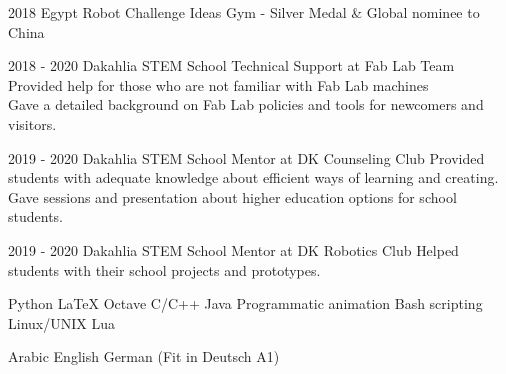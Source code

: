 \documentclass[hidelinks]{report}
\begin{document}
\entry
    {2018}
    {Egypt Robot Challenge} 
    {Ideas Gym}
    {- Silver Medal \& Global nominee to China} 

\vspace{2mm}
    

\entry
    {2018 - 2020}
    {Dakahlia STEM School} 
    {Technical Support at Fab Lab Team} 
    {
     \textbullet Provided help for those who are not familiar with Fab Lab machines\\
     \textbullet Gave a detailed background on Fab Lab policies and tools for newcomers and visitors.
    }
    
\entry
    {2019 - 2020}
    {Dakahlia STEM School}  
    {Mentor at DK Counseling Club} 
    {
     \textbullet Provided students with adequate knowledge about efficient ways of learning and creating.\\
     \textbullet Gave sessions and presentation about higher education options for school students.
    }

\entry
    {2019 - 2020}
    {Dakahlia STEM School}
    {Mentor at DK Robotics Club} 
    {\textbullet Helped students with their school projects and prototypes.}

\vspace{2mm}
    


\col
      {Python}          {\LaTeX}        {Octave} %
      {C/C++}           {Java}          {Programmatic animation}%
      {Bash scripting}  {Linux/UNIX}    {Lua}%

\vspace{2mm}

\col 
    {Arabic}
    {English}
    {German (Fit in Deutsch A1)}
    {} {} {} {} {} {}
\end{document}
